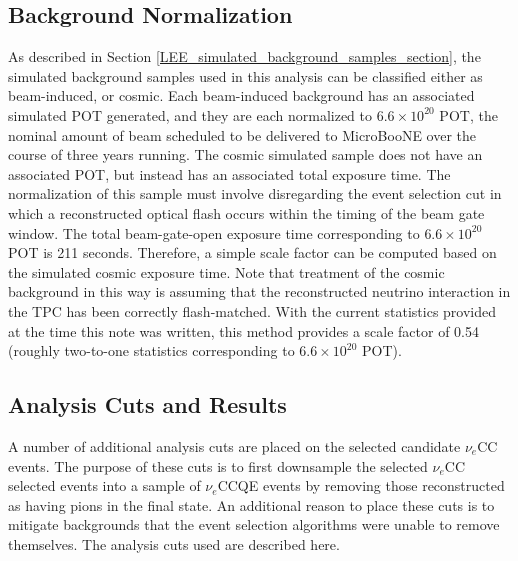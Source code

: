 \subsection{Background Normalization}\label{LEE_background_normalization_section}
As described in Section \ref{LEE_simulated_background_samples_section}, the simulated background samples used in this analysis can be classified either as beam-induced, or cosmic. Each beam-induced background has an associated simulated POT generated, and they are each normalized to $6.6\times10^{20}$ POT, the nominal amount of beam scheduled to be delivered to MicroBooNE over the course of three years running. The cosmic simulated sample does not have an associated POT, but instead has an associated total exposure time. The normalization of this sample must involve disregarding the event selection cut in which a reconstructed optical flash occurs within the timing of the beam gate window. The total beam-gate-open exposure time corresponding to $6.6\times10^{20}$ POT is 211 seconds. Therefore, a simple scale factor can be computed based on the simulated cosmic exposure time. Note that treatment of the cosmic background in this way is assuming that the reconstructed neutrino interaction in the TPC has been correctly flash-matched. With the current statistics provided at the time this note was written, this method provides a scale factor of 0.54 (roughly two-to-one statistics corresponding to $6.6\times10^{20}$ POT).



\subsection{Analysis Cuts and Results}\label{analysis_cut_descript_section}


A number of additional analysis cuts are placed on the selected candidate $\nu_e$CC events. The purpose of these cuts is to first downsample the selected $\nu_e$CC selected events into a sample of $\nu_e$CCQE events by removing those reconstructed as having pions in the final state. An additional reason to place these cuts is to mitigate backgrounds that the event selection algorithms were unable to remove themselves. The analysis cuts used are described here.\\

